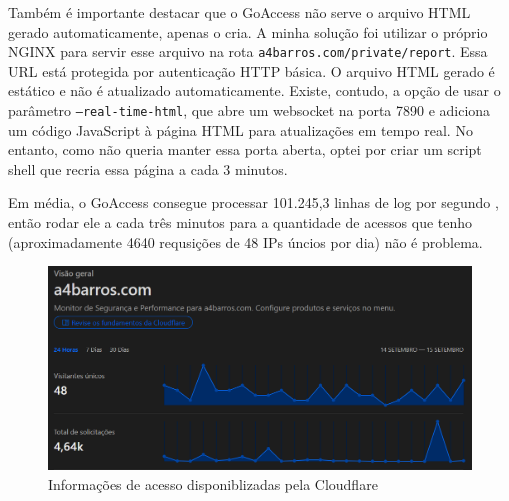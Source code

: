 Também é importante destacar que o GoAccess não serve o arquivo HTML gerado 
automaticamente, apenas o cria. A minha solução foi utilizar o próprio NGINX para 
servir esse arquivo na rota \texttt{a4barros.com/private/report}. Essa URL está 
protegida por autenticação HTTP básica. O arquivo HTML gerado é estático e não é 
atualizado automaticamente. Existe, contudo, a opção de usar o parâmetro 
\texttt{--real-time-html}, que abre um websocket na porta 7890 e adiciona um código 
JavaScript à página HTML para atualizações em tempo real. No entanto, como não 
queria manter essa porta aberta, optei por criar um script shell que recria essa
página a cada 3 minutos.



Em média, o GoAccess consegue processar 101.245,3 linhas de log por segundo 
\cite{goaccess-speed}, então rodar ele a cada três minutos para a quantidade de 
acessos que tenho (aproximadamente 4640 requsições de 48 IPs úncios por dia) não 
é problema.

\begin{figure}[ht]
    \begin{center}
    \includegraphics[width=400pt]{img/cloudflare-stat.png}
    \caption{Informações de acesso disponiblizadas pela Cloudflare}
    \label{fig:cloudflare-stat.png}
    \end{center}
\end{figure}